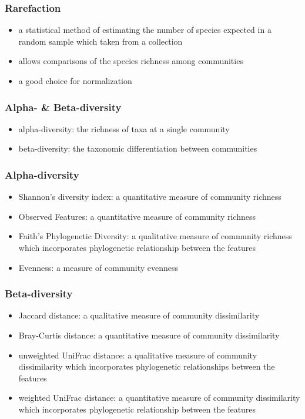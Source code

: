 \documentclass{beamer}
\begin{document}
    \begin{frame}
        \frametitle{Rarefaction}

        \begin{itemize}
            \item a statistical method of estimating the number of species expected in a random sample which taken from a collection \cite{rarefaction1}
            \item allows comparisons of the species richness among communities
            \item a good choice for normalization \cite{rarefaction2}
        \end{itemize}
    \end{frame}

    \begin{frame}
        \frametitle{Alpha- \& Beta-diversity}

        \begin{itemize}
            \item alpha-diversity: the richness of taxa at a single community
            \item beta-diversity: the taxonomic differentiation between communities
        \end{itemize}
    \end{frame}

    \begin{frame}
        \frametitle{Alpha-diversity}

        \begin{itemize}
            \item Shannon's diversity index: a quantitative measure of community richness
            \item Observed Features: a quantitative measure of community richness
            \item Faith's Phylogenetic Diversity: a qualitative measure of community richness which incorporates phylogenetic relationship between the features
            \item Evenness: a measure of community evenness
        \end{itemize}
        \cite{qiime1, qiime2}
    \end{frame}

    \begin{frame}
        \frametitle{Beta-diversity}

        \begin{itemize}
            \item Jaccard distance: a qualitative measure of community dissimilarity
            \item Bray-Curtis distance: a quantitative measure of community dissimilarity
            \item unweighted UniFrac distance: a qualitative measure of community dissimilarity which incorporates phylogenetic relationships between the features
            \item weighted UniFrac distance: a quantitative measure of community dissimilarity which incorporates phylogenetic relationship between the features
        \end{itemize}
        \cite{qiime1, qiime2}
    \end{frame}
\end{document}
